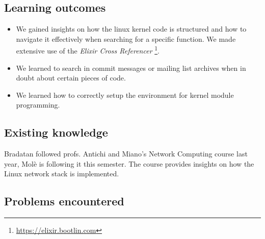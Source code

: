 \documentclass[10pt,a4]{article}
\begin{document}
\subsection{Learning outcomes}
\begin{itemize}

\item We gained insights on how the linux kernel code is structured and how to navigate it
effectively when searching for a specific function. We made extensive use of the \textit{Elixir Cross Referencer} \footnote{\url{https://elixir.bootlin.com}}.

\item We learned to search in commit messages or mailing list archives when in doubt about certain pieces of code.
\item We learned how to correctly setup the environment for kernel module programming.

\end{itemize}




\subsection{Existing knowledge}

Bradatan followed profs. Antichi and Miano's Network Computing course last year,
Molè is following it this semester. The course provides insights on how the Linux
network stack is implemented.

\subsection{Problems encountered}
%
\end{document}
